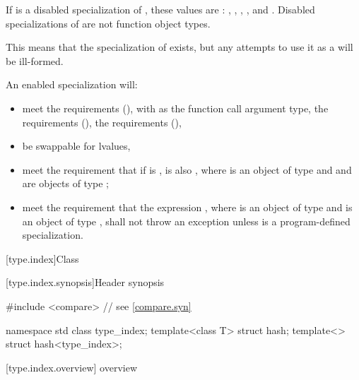 \pnum
If  is a disabled specialization of ,
these values are :
,
,
,
, and
.
Disabled specializations of 
are not function object types.
\begin{note}
This means that the specialization of  exists, but
any attempts to use it as a  will be ill-formed.
\end{note}

\pnum
An enabled specialization  will:
\begin{itemize}
\item meet the  requirements (),
with  as the function
call argument type, the  requirements (),
the  requirements (),
\item be swappable for lvalues,
\item meet the requirement that if  is ,  is
also , where  is an object of type  and  and 
are objects of type ;
\item meet the requirement that the expression , where 
is an object of type  and  is an object of type
, shall not throw an exception unless  is a
program-defined specialization.
\end{itemize}

[type.index]{Class }

[type.index.synopsis]{Header  synopsis}

%
\begin{codeblock}
#include <compare>              // see \ref{compare.syn}

namespace std {
  class type_index;
  template<class T> struct hash;
  template<> struct hash<type_index>;
}
\end{codeblock}

[type.index.overview]{ overview}

